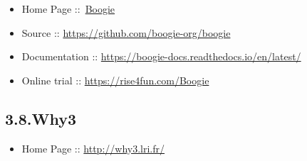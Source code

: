 \documentclass[12pt,twoside]{article}
\begin{document}
\begin{itemize}[noitemsep,topsep=\mdcompacttopsep]%

\item{}Home Page ::~\href{https://www.microsoft.com/en-us/research/project/boogie-an-intermediate-verification-language}{Boogie}%

\item{}Source :: \href{https://github.com/boogie-org/boogie}{{\ttfamily https://\hspace{0pt}github.\hspace{0pt}com/\hspace{0pt}boogie-\hspace{0pt}org/\hspace{0pt}boogie}}%

\item{}Documentation :: \href{https://boogie-docs.readthedocs.io/en/latest/}{{\ttfamily https://\hspace{0pt}boogie-\hspace{0pt}docs.\hspace{0pt}readthedocs.\hspace{0pt}io/\hspace{0pt}en/\hspace{0pt}latest/\hspace{0pt}}}%

\item{}Online trial :: \href{https://rise4fun.com/Boogie}{{\ttfamily https://\hspace{0pt}rise4fun.\hspace{0pt}com/\hspace{0pt}Boogie}}%
\end{itemize}%

\subsection{3.8.\hspace*{0.5em}Why3}\label{sec-why3}%

\begin{itemize}[noitemsep,topsep=\mdcompacttopsep]%

\item{}Home Page :: \href{http://why3.lri.fr/}{{\ttfamily http://\hspace{0pt}why3.\hspace{0pt}lri.\hspace{0pt}fr/\hspace{0pt}}}%
\end{itemize}%
\end{document}
